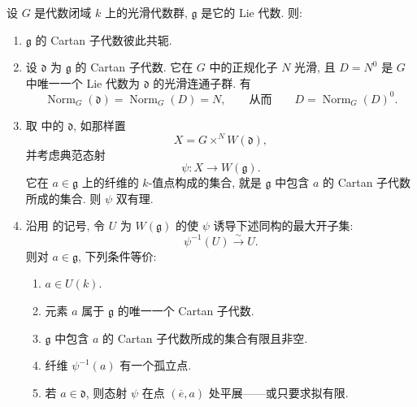 \begin{theorem}
设 \(G\) 是代数闭域 \(k\) 上的光滑代数群, \(\mathfrak g\) 是它的 Lie 代数. 则:
\begin{enumerate}
  \item[a)]
  \(\mathfrak g\) 的 Cartan 子代数彼此共轭.

  \item[b)]
  设 \(\mathfrak d\) 为 \(\mathfrak g\) 的 Cartan 子代数. 它在 \(G\) 中的正规化子 \(N\) 光滑, 且 \(D=N^0\) 是 \(G\) 中唯一一个 Lie 代数为 \(\mathfrak d\) 的光滑连通子群. 有
  \[
    \operatorname{Norm}_G(\mathfrak d)
    =\operatorname{Norm}_G(D)
    =N,
    \qquad\text{从而}\qquad
    D=\operatorname{Norm}_G(D)^0.
  \]

  \item[c)]
  取  中的 \(\mathfrak d\), 如那样置
  \[
    X=G\times^N W(\mathfrak d),
  \]
  并考虑典范态射
  \[
    \psi:X\longrightarrow W(\mathfrak g).
  \]
  它在 \(a\in\mathfrak g\) 上的纤维的 \(k\)-值点构成的集合, 就是 \(\mathfrak g\) 中包含 \(a\) 的 Cartan 子代数所成的集合. 则 \(\psi\) 双有理.

  \item[d)]
  沿用  的记号, 令 \(U\) 为 \(W(\mathfrak g)\) 的使 \(\psi\) 诱导下述同构的最大开子集:
  \[
    \psi^{-1}(U)\xrightarrow{\sim}U.
  \]
  则对 \(a\in\mathfrak g\), 下列条件等价:
  \begin{enumerate}
    \item[(i)]
    \(a\in U(k)\).

    \item[(ii)]
    元素 \(a\) 属于 \(\mathfrak g\) 的唯一一个 Cartan 子代数.

    \item[(iii)]
    \(\mathfrak g\) 中包含 \(a\) 的 Cartan 子代数所成的集合有限且非空.

    \item[(iv)]
    纤维 \(\psi^{-1}(a)\) 有一个孤立点.

    \item[(v)]
    若 \(a\in\mathfrak d\), 则态射 \(\psi\) 在点 \((\overline e,a)\) 处平展——或只要求拟有限.


\end{enumerate}
\end{enumerate}
\end{theorem}
